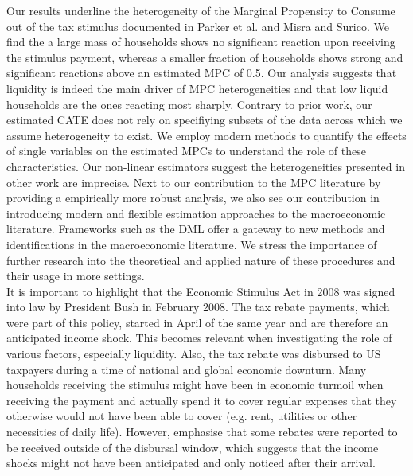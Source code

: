 Our results underline the heterogeneity of the Marginal Propensity to Consume out of the tax stimulus documented in Parker et al. and Misra and Surico. We find the a large mass of households shows no significant reaction upon receiving the stimulus payment, whereas a smaller fraction of households shows strong and significant reactions above an estimated MPC of 0.5. Our analysis suggests that liquidity is indeed the main driver of MPC heterogeneities and that low liquid households are the ones reacting most sharply. Contrary to prior work, our estimated CATE does not rely on specifiying subsets of the data across which we assume heterogeneity to exist. We employ modern methods to quantify the effects of single variables on the estimated MPCs to understand the role of these characteristics. Our non-linear estimators suggest the heterogeneities presented in other work are imprecise. Next to our contribution to the MPC literature by providing a empirically more robust analysis, we also see our contribution in introducing modern and flexible estimation approaches to the macroeconomic literature. Frameworks such as the DML offer a gateway to new methods and identifications in the macroeconomic literature. We stress the importance of further research into the theoretical and applied nature of these procedures and their usage in more settings. \\
It is important to highlight that the Economic Stimulus Act in 2008 was signed into law by President Bush in February 2008. The tax rebate payments, which were part of this policy, started in April of the same year and are therefore an anticipated income shock. This becomes relevant when investigating the role of various factors, especially liquidity. Also, the tax rebate was disbursed to US taxpayers during a time of national and global economic downturn. Many households receiving the stimulus might have been in economic turmoil when receiving the payment and actually spend it to cover regular expenses that they otherwise would not have been able to cover (e.g. rent, utilities or other necessities of daily life). However, \cite{parker_etal_13} emphasise that some rebates were reported to be received outside of the disbursal window, which suggests that the income shocks might not have been anticipated and only noticed after their arrival. \\
